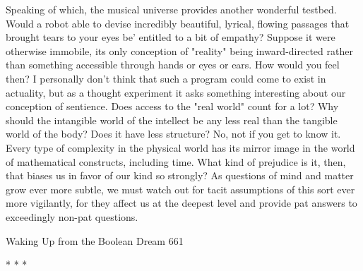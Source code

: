         Speaking of which, the musical universe provides another wonderful testbed.
Would a robot able to devise incredibly beautiful, lyrical, flowing passages that
brought tears to your eyes be' entitled to a bit of empathy? Suppose it were otherwise
immobile, its only conception of "reality" being inward-directed rather than
something accessible through hands or eyes or ears. How would you feel then?
        I personally don't think that such a program could come to exist in actuality,
but as a thought experiment it asks something interesting about our conception of
sentience. Does access to the "real world" count for a lot? Why should the intangible
world of the intellect be any less real than the tangible world of the body? Does it
have less structure? No, not if you get to know it. Every type of complexity in the
physical world has its mirror image in the world of mathematical constructs, including
time. What kind of prejudice is it, then, that biases us in favor of our kind so strongly?
As questions of mind and matter grow ever more subtle, we must watch out for tacit
assumptions of this sort ever more vigilantly, for they affect us at the deepest level
and provide pat answers to exceedingly non-pat questions.




Waking Up from the Boolean Dream                                                      661

                                        *   *   *

